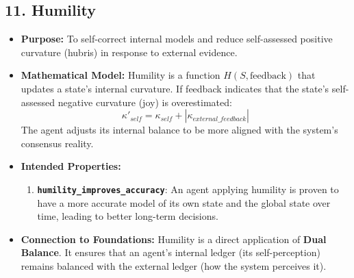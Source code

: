 \documentclass[11pt,a4paper]{article}
\begin{document}
\begin{itemize}
\subsection{11. Humility}
\begin{itemize}
    \item \textbf{Purpose:} To self-correct internal models and reduce self-assessed positive curvature (hubris) in response to external evidence.
    \item \textbf{Mathematical Model:} Humility is a function $H(S, \text{feedback})$ that updates a state's internal curvature.
        If feedback indicates that the state's self-assessed negative curvature (joy) is overestimated:
        \[ \kappa'_{self} = \kappa_{self} + |\kappa_{external\_feedback}| \]
        The agent adjusts its internal balance to be more aligned with the system's consensus reality.
    \item \textbf{Intended Properties:}
        \begin{enumerate}
            \item \textbf{\texttt{humility\_improves\_accuracy}}: An agent applying humility is proven to have a more accurate model of its own state and the global state over time, leading to better long-term decisions.
        \end{enumerate}
    \item \textbf{Connection to Foundations:} Humility is a direct application of \textbf{Dual Balance}. It ensures that an agent's internal ledger (its self-perception) remains balanced with the external ledger (how the system perceives it).
\end{itemize}


\end{itemize}
\end{document}
